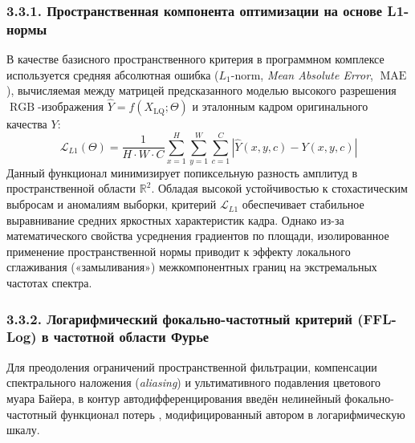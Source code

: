 \documentclass[12pt,a4paper]{article}
\begin{document}
\subsubsection{3.3.1. Пространственная компонента оптимизации на основе L1-нормы}

В качестве базисного пространственного критерия в программном комплексе используется средняя абсолютная ошибка ($L_1$-norm, \textit{Mean Absolute Error}, $\operatorname{MAE}$), вычисляемая между матрицей предсказанного моделью высокого разрешения $\operatorname{RGB}$-изображения $\hat{Y} = f(X_{\text{LQ}}; \Theta)$ и эталонным кадром оригинального качества $Y$:
\begin{equation}
\mathcal{L}_{L1}(\Theta) = \frac{1}{H \cdot W \cdot C} \sum_{x=1}^{H} \sum_{y=1}^{W} \sum_{c=1}^{C} \left| \hat{Y}(x,y,c) - Y(x,y,c) \right|
\end{equation}
Данный функционал минимизирует попиксельную разность амплитуд в пространственной области $\mathbb{R}^2$. Обладая высокой устойчивостью к стохастическим выбросам и аномалиям выборки, критерий $\mathcal{L}_{L1}$ обеспечивает стабильное выравнивание средних яркостных характеристик кадра. Однако из-за математического свойства усреднения градиентов по площади, изолированное применение пространственной нормы приводит к эффекту локального сглаживания («замыливания») межкомпонентных границ на экстремальных частотах спектра.

\subsubsection{3.3.2. Логарифмический фокально-частотный критерий (FFL-Log) в частотной области Фурье}

Для преодоления ограничений пространственной фильтрации, компенсации спектрального наложения (\textit{aliasing}) и ультимативного подавления цветового муара Байера, в контур автодифференцирования введён нелинейный фокально-частотный функционал потерь \cite{jiang2021focal}, модифицированный автором в логарифмическую шкалу. 
\end{document}
